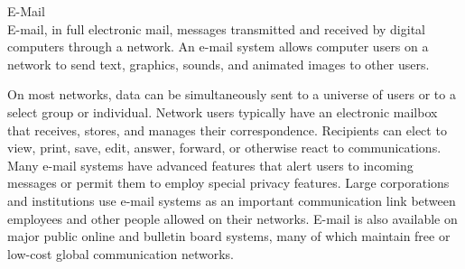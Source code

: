 \documentclass[11pt,a4paper,twoside]{article}
\begin{document}
E-Mail\\
E-mail, in full electronic mail, messages transmitted and received by digital computers through a network. An e-mail system allows computer users on a network to send text, graphics, sounds, and animated images to other users.\par
On most networks, data can be simultaneously sent to a universe of users or to a select group or individual. Network users typically have an electronic mailbox that receives, stores, and manages their correspondence. Recipients can elect to view, print, save, edit, answer, forward, or otherwise react to communications. Many e-mail systems have advanced features that alert users to incoming messages or permit them to employ special privacy features. Large corporations and institutions use e-mail systems as an important communication link between employees and other people allowed on their networks. E-mail is also available on major public online and bulletin board systems, many of which maintain free or low-cost global communication networks.
\end{document}
